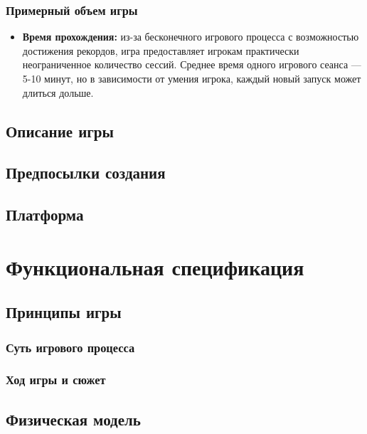\documentclass{article}
\begin{document}
\subsubsection{Примерный объем игры}
\begin{itemize}
    \item \textbf{Время прохождения:} из-за бесконечного игрового процесса с возможностью достижения рекордов, игра предоставляет игрокам практически неограниченное количество сессий. Среднее время одного игрового сеанса — 5-10 минут, но в зависимости от умения игрока, каждый новый запуск может длиться дольше.
\end{itemize}




\subsection{Описание игры}

\subsection{Предпосылки создания}

\subsection{Платформа}

\section{Функциональная спецификация}

\subsection{Принципы игры}

\subsubsection{Суть игрового процесса}

\subsubsection{Ход игры и сюжет}

\subsection{Физическая модель}
\end{document}

